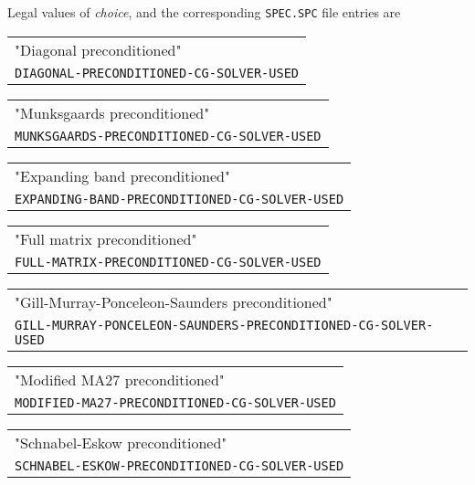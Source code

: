 \documentclass[12pt]{article}
\begin{document}
Legal values of {\it choice}, and the corresponding
{\tt SPEC.SPC} file entries are
\begin{center}
 \begin{tabular}{l}
  "Diagonal preconditioned"\\
  \parbox[t]{5.in}{\hfill\tt DIAGONAL-PRECONDITIONED-CG-SOLVER-USED}\\
 \end{tabular}
\end{center}
\begin{center}
 \begin{tabular}{l}
  "Munksgaards preconditioned"\\
  \parbox[t]{5.in}{\hfill\tt MUNKSGAARDS-PRECONDITIONED-CG-SOLVER-USED}\\
 \end{tabular}
\end{center}
\begin{center}
 \begin{tabular}{l}
  "Expanding band preconditioned"\\
  \parbox[t]{5.in}{\hfill\tt EXPANDING-BAND-PRECONDITIONED-CG-SOLVER-USED}\\
 \end{tabular}
\end{center}
\begin{center}
 \begin{tabular}{l}
  "Full matrix preconditioned"\\
  \parbox[t]{5.in}{\hfill\tt FULL-MATRIX-PRECONDITIONED-CG-SOLVER-USED}\\
 \end{tabular}
\end{center}
\begin{center}
 \begin{tabular}{l}
  "Gill-Murray-Ponceleon-Saunders preconditioned"\\
  \parbox[t]{5.in}{\hfill\tt GILL-MURRAY-PONCELEON-SAUNDERS-PRECONDITIONED-CG-SOLVER-USED}\\
 \end{tabular}
\end{center}
\begin{center}
 \begin{tabular}{l}
  "Modified MA27 preconditioned"\\
  \parbox[t]{5.in}{\hfill\tt MODIFIED-MA27-PRECONDITIONED-CG-SOLVER-USED}\\
 \end{tabular}
\end{center}
\begin{center}
 \begin{tabular}{l}
  "Schnabel-Eskow preconditioned"\\
  \parbox[t]{5.in}{\hfill\tt SCHNABEL-ESKOW-PRECONDITIONED-CG-SOLVER-USED}\\
 \end{tabular}
\end{center}
\end{document}
